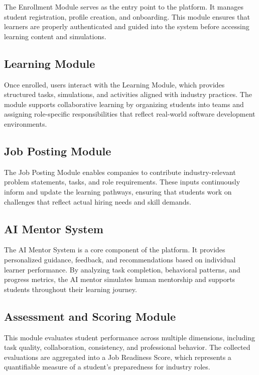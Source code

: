 \documentclass[12pt,a4paper]{report}
\begin{document}
The Enrollment Module serves as the entry point to the platform. It manages student
registration, profile creation, and onboarding. This module ensures that learners are
properly authenticated and guided into the system before accessing learning content
and simulations.

\subsection{Learning Module}

Once enrolled, users interact with the Learning Module, which provides structured tasks,
simulations, and activities aligned with industry practices. The module supports
collaborative learning by organizing students into teams and assigning role-specific
responsibilities that reflect real-world software development environments.

\subsection{Job Posting Module}

The Job Posting Module enables companies to contribute industry-relevant problem
statements, tasks, and role requirements. These inputs continuously inform and update
the learning pathways, ensuring that students work on challenges that reflect actual
hiring needs and skill demands.

\subsection{AI Mentor System}

The AI Mentor System is a core component of the platform. It provides personalized
guidance, feedback, and recommendations based on individual learner performance.
By analyzing task completion, behavioral patterns, and progress metrics, the AI mentor
simulates human mentorship and supports students throughout their learning journey.

\subsection{Assessment and Scoring Module}

This module evaluates student performance across multiple dimensions, including task
quality, collaboration, consistency, and professional behavior. The collected evaluations
are aggregated into a Job Readiness Score, which represents a quantifiable measure of a
student’s preparedness for industry roles.
\end{document}
